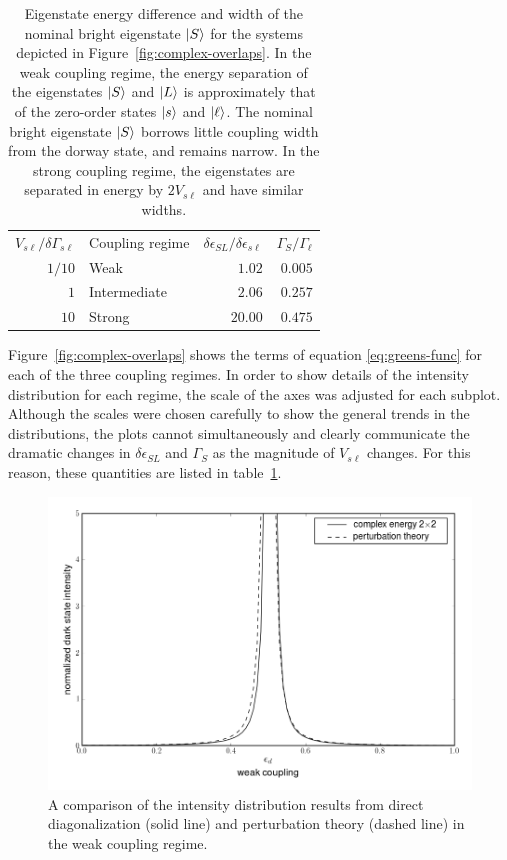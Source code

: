 \documentclass[12pt]{mitthesis}
\begin{document}
\begin{table}
  \caption{Eigenstate energy difference and width of the nominal
    bright eigenstate $\mathinner{|{S}\rangle}$ for the systems depicted in 
    Figure~\ref{fig:complex-overlaps}.  In the weak coupling regime, 
    the energy separation of the eigenstates $\mathinner{|{S}\rangle}$ and $\mathinner{|{L}\rangle}$ 
    is approximately that of the zero-order states $\mathinner{|{s}\rangle}$ and 
    $\mathinner{|{\ell}\rangle}$.  The nominal bright eigenstate $\mathinner{|{S}\rangle}$ borrows 
    little coupling width from the dorway state, and remains narrow.
    In the strong coupling regime, the eigenstates are
    separated in energy by $2V_{s\ell}$ and have similar widths.}
  \label{table:complex-int-params}
  \centering
  \begin{tabular}{rlrr}
    & \\
    \toprule
    $V_{s\ell} / \delta \Gamma_{s\ell}$ & Coupling regime & $\delta
    \epsilon_{SL} / \delta \epsilon_{s\ell}$ & $\Gamma_S / \Gamma_{\ell}$ \\
    \midrule
    $1/10$ & Weak & $1.02$ & $0.005$ \\
    $1$ & Intermediate & $2.06$ & $0.257$ \\
    $10$ & Strong & $20.00$ & $0.475$ \\
    \bottomrule
  \end{tabular}
\end{table}
Figure~\ref{fig:complex-overlaps} shows the terms of equation
\ref{eq:greens-func} for each of the three coupling regimes. In order
to show details of the intensity distribution for each regime, the
scale of the axes was adjusted for each subplot. Although the scales
were chosen carefully to show the general trends in the distributions,
the plots cannot simultaneously and clearly communicate the
dramatic changes in $\delta \epsilon_{SL}$ and $\Gamma_S$ as the
magnitude of $V_{s\ell}$ changes. For this reason, these quantities
are listed in table~\ref{table:complex-int-params}.

\begin{figure}
  \caption{A comparison of the intensity distribution results from
    direct diagonalization (solid line) and perturbation theory
    (dashed line) in the weak coupling regime.}
  \label{fig:complex-compare-weak}
  \centering
  \includegraphics[width=6in]{complex-compare-weak.png}
\end{figure}
\end{document}
